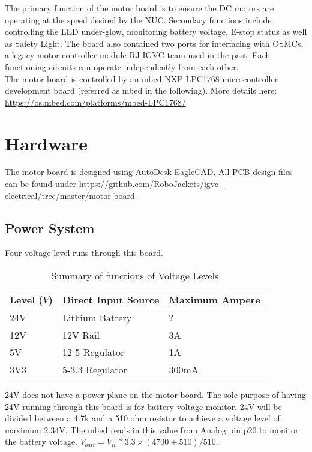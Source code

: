 \documentclass[letterpaper, 12pt]{article}
\begin{document}
The primary function of the motor board is to ensure the DC motors are operating at the speed desired by the NUC. Secondary functions include controlling the LED under-glow, monitoring battery voltage, E-stop status as well as Safety Light. The board also contained two ports for interfacing with OSMCs, a legacy motor controller module RJ IGVC team used in the past. Each functioning circuits can operate independently from each other. \vspace{6pt}\\


The motor board is controlled by an mbed NXP LPC1768 microcontroller development board (referred as mbed in the following). More details here: \url{https://os.mbed.com/platforms/mbed-LPC1768/} \vspace{6pt}\\
\pagebreak

\section{Hardware}
The motor board is designed using AutoDesk EagleCAD. All PCB design files can be found under \url{https://github.com/RoboJackets/igvc-electrical/tree/master/motor board}
\subsection{Power System}
Four voltage level runs through this board. 
\begin{table}[h]
\caption{Summary of functions of Voltage Levels}
\centering
\begin{tabular}{p{3cm}p{4cm}p{4cm}}
\toprule
Level ($V$)  & Direct Input Source & Maximum Ampere \\
\midrule
24V  & Lithium Battery & ? \\
12V  & 12V Rail & 3A  \\
5V  & 12-5 Regulator & 1A \\
3V3 & 5-3.3 Regulator & 300mA \\
\bottomrule
\end{tabular}
\end{table}

24V does not have a power plane on the motor board. The sole purpose of having 24V running through this board is for battery voltage monitor. 24V will be divided between a 4.7k and a 510 ohm resistor to achieve a voltage level of maximum 2.34V. The mbed reads in this value from Analog pin p20 to monitor the battery voltage. $V_{batt} = V_{in} * 3.3 \times (4700 + 510) / 510$. \\
\end{document}

